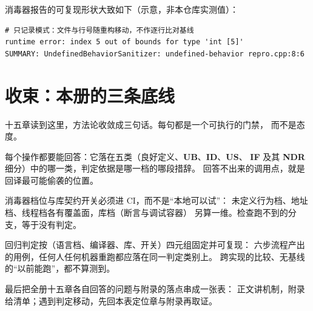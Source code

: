 \documentclass[12pt,a4paper,fontset=fandol]{ctexbook}
\newcommand{\UB}{\textbf{\textsf{UB}}}
\newcommand{\IDB}{\textbf{\textsf{ID}}}
\newcommand{\USB}{\textbf{\textsf{US}}}
\newcommand{\NDR}{\textbf{\textsf{NDR}}}
\newcommand{\ILLF}{\textbf{\textsf{IF}}}
\begin{document}
消毒器报告的可复现形状大致如下（示意，非本仓库实测值）：

\begin{lstlisting}[style=outstyle, caption={outstyle：报告形状的模式化记录}]
# 只记录模式：文件与行号随重构移动，不作逐行比对基线
runtime error: index 5 out of bounds for type 'int [5]'
SUMMARY: UndefinedBehaviorSanitizer: undefined-behavior repro.cpp:8:6
\end{lstlisting}

\section{收束：本册的三条底线}\label{sec:ub15-closing}

十五章读到这里，方法论收敛成三句话。每句都是一个可执行的门禁，
而不是态度。

\begin{guideline}[title=底线一：契约可见]
每个操作都要能回答：它落在五类（良好定义、\UB{}、\IDB{}、\USB{}、
\ILLF{} 及其 \NDR{} 细分）中的哪一类，判定依据是哪一档的哪段措辞。
回答不出来的调用点，就是回译最可能偷袭的位置。
\end{guideline}

\begin{guideline}[title=底线二：检查可跑]
消毒器档位与库契约开关必须进 CI，而不是“本地可以试”：
未定义行为档、地址档、线程档各有覆盖面，库档（断言与调试容器）
另算一维。检查跑不到的分支，等于没有判定。
\end{guideline}

\begin{guideline}[title=底线三：行为可测]
回归判定按（语言档、编译器、库、开关）四元组固定并可复现：
六步流程产出的用例，任何人任何机器重跑都应落在同一判定类别上。
跨实现的比较、无基线的“以前能跑”，都不算测到。
\end{guideline}

最后把全册十五章各自回答的问题与附录的落点串成一张表：
正文讲机制，附录给清单；遇到判定移动，先回本表定位章与附录再取证。
\end{document}
